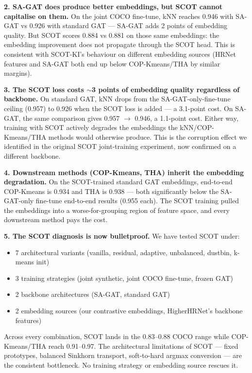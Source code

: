 \textbf{2. SA-GAT does produce better embeddings, but SCOT cannot capitalise on them.} On the joint COCO fine-tune, kNN reaches 0.946 with SA-GAT vs 0.926 with standard GAT --- SA-GAT adds 2 points of embedding quality. But SCOT scores 0.884 vs 0.881 on those same embeddings: the embedding improvement does not propagate through the SCOT head. This is consistent with SCOT-KI's behaviour on different embedding sources (HRNet features and SA-GAT both end up below COP-Kmeans/THA by similar margins).

\textbf{3. The SCOT loss costs $\sim$3 points of embedding quality regardless of backbone.} On standard GAT, kNN drops from the SA-GAT-only-fine-tune ceiling (0.957) to 0.926 when the SCOT loss is added --- a 3.1-point cost. On SA-GAT, the same comparison gives 0.957 $\to$ 0.946, a 1.1-point cost. Either way, training with SCOT actively degrades the embeddings the kNN/COP-Kmeans/THA methods would otherwise produce. This is the corruption effect we identified in the original SCOT joint-training experiment, now confirmed on a different backbone.

\textbf{4. Downstream methods (COP-Kmeans, THA) inherit the embedding degradation.} On the SCOT-trained standard GAT embeddings, end-to-end COP-Kmeans is 0.934 and THA is 0.938 --- both significantly below the SA-GAT-only fine-tune end-to-end results (0.955 each). The SCOT training pulled the embeddings into a worse-for-grouping region of feature space, and every downstream method pays the cost.

\textbf{5. The SCOT diagnosis is now bulletproof.} We have tested SCOT under:
\begin{itemize}
    \item 7 architectural variants (vanilla, residual, adaptive, unbalanced, dustbin, k-means init)
    \item 3 training strategies (joint synthetic, joint COCO fine-tune, frozen GAT)
    \item 2 backbone architectures (SA-GAT, standard GAT)
    \item 2 embedding sources (our contrastive embeddings, HigherHRNet's backbone features)
\end{itemize}
Across every combination, SCOT lands in the 0.83--0.88 COCO range while COP-Kmeans/THA reach 0.91--0.97. The architectural limitations of SCOT --- fixed prototypes, balanced Sinkhorn transport, soft-to-hard argmax conversion --- are the consistent bottleneck. No training strategy or embedding source rescues it.



